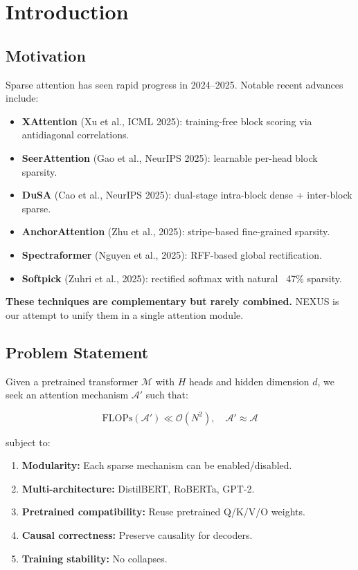 \section{Introduction}

\subsection{Motivation}

Sparse attention has seen rapid progress in 2024--2025. Notable recent 
advances include:

\begin{itemize}
\item \textbf{XAttention} (Xu et al., ICML 2025): training-free block scoring via
  antidiagonal correlations.
\item \textbf{SeerAttention} (Gao et al., NeurIPS 2025): learnable per-head block
  sparsity.
\item \textbf{DuSA} (Cao et al., NeurIPS 2025): dual-stage intra-block dense +
  inter-block sparse.
\item \textbf{AnchorAttention} (Zhu et al., 2025): stripe-based fine-grained sparsity.
\item \textbf{Spectraformer} (Nguyen et al., 2025): RFF-based global rectification.
\item \textbf{Softpick} (Zuhri et al., 2025): rectified softmax with natural ~47\%
  sparsity.

\end{itemize}
\textbf{These techniques are complementary but rarely combined.} NEXUS is our 
attempt to unify them in a single attention module.

\subsection{Problem Statement}

Given a pretrained transformer $\mathcal{M}$ with $H$ heads and hidden 
dimension $d$, we seek an attention mechanism $\mathcal{A}'$ such that:

\[
\text{FLOPs}(\mathcal{A}') \ll \mathcal{O}(N^2), \quad
\mathcal{A}' \approx \mathcal{A}
\tag{1.1}
\]

subject to:

\begin{enumerate}
\item \textbf{Modularity:} Each sparse mechanism can be enabled/disabled.
\item \textbf{Multi-architecture:} DistilBERT, RoBERTa, GPT-2.
\item \textbf{Pretrained compatibility:} Reuse pretrained Q/K/V/O weights.
\item \textbf{Causal correctness:} Preserve causality for decoders.
\item \textbf{Training stability:} No collapses.

\end{enumerate}
